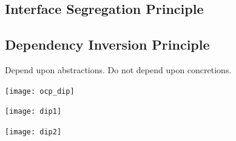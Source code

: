 \documentclass[xcolor=svgnames]{beamer}
\begin{document}

\begin{frame}{\subsecname}
\end{frame}


\subsection{Interface Segregation Principle}


\begin{frame}{\subsecname}
\end{frame}


\subsection{Dependency Inversion Principle}


\begin{frame}{\subsecname}
    Depend upon abstractions.  \pause Do not depend upon concretions.
\end{frame}


\begin{frame}{\subsecname}
    \centering
    \texttt{[image: ocp\_dip]}
\end{frame}


\begin{frame}{\subsecname}
    \centering
    \texttt{[image: dip1]}
\end{frame}


\begin{frame}{\subsecname}
    \centering
    \texttt{[image: dip2]}
\end{frame}
\end{document}
